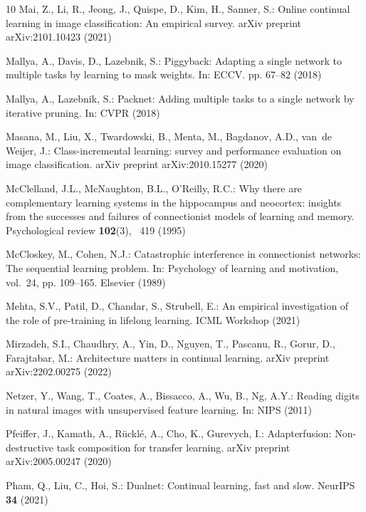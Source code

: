 \documentclass[runningheads]{llncs}
\begin{document}
\begin{thebibliography}{10}
Mai, Z., Li, R., Jeong, J., Quispe, D., Kim, H., Sanner, S.: Online continual
  learning in image classification: An empirical survey. arXiv preprint
  arXiv:2101.10423  (2021)

Mallya, A., Davis, D., Lazebnik, S.: Piggyback: Adapting a single network to
  multiple tasks by learning to mask weights. In: ECCV. pp. 67--82 (2018)

Mallya, A., Lazebnik, S.: Packnet: Adding multiple tasks to a single network by
  iterative pruning. In: CVPR (2018)

Masana, M., Liu, X., Twardowski, B., Menta, M., Bagdanov, A.D., van~de Weijer,
  J.: Class-incremental learning: survey and performance evaluation on image
  classification. arXiv preprint arXiv:2010.15277  (2020)

McClelland, J.L., McNaughton, B.L., O'Reilly, R.C.: Why there are complementary
  learning systems in the hippocampus and neocortex: insights from the
  successes and failures of connectionist models of learning and memory.
  Psychological review  \textbf{102}(3), ~419 (1995)

McCloskey, M., Cohen, N.J.: Catastrophic interference in connectionist
  networks: The sequential learning problem. In: Psychology of learning and
  motivation, vol.~24, pp. 109--165. Elsevier (1989)

Mehta, S.V., Patil, D., Chandar, S., Strubell, E.: An empirical investigation
  of the role of pre-training in lifelong learning. ICML Workshop  (2021)

Mirzadeh, S.I., Chaudhry, A., Yin, D., Nguyen, T., Pascanu, R., Gorur, D.,
  Farajtabar, M.: Architecture matters in continual learning. arXiv preprint
  arXiv:2202.00275  (2022)

Netzer, Y., Wang, T., Coates, A., Bissacco, A., Wu, B., Ng, A.Y.: Reading
  digits in natural images with unsupervised feature learning. In: NIPS (2011)

Pfeiffer, J., Kamath, A., R{\"u}ckl{\'e}, A., Cho, K., Gurevych, I.:
  Adapterfusion: Non-destructive task composition for transfer learning. arXiv
  preprint arXiv:2005.00247  (2020)

Pham, Q., Liu, C., Hoi, S.: Dualnet: Continual learning, fast and slow. NeurIPS
   \textbf{34} (2021)


\end{thebibliography}
\end{document}
